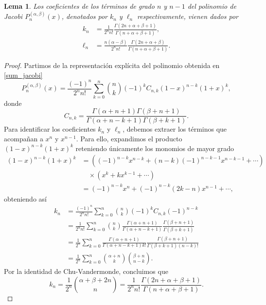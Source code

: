 \documentclass[12pt,a4paper]{book}
\newtheorem{lemma}[theorem]{Lema}
\begin{document}
\begin{lemma}
\label{lema:coeficiente_principal}
Los coeficientes de los términos de grado $n$ y $n-1$ del polinomio de Jacobi $P_n^{(\alpha, \beta)}(x)$, denotados por $k_n$ y $\ell_n$ respectivamente, vienen dados por
\begin{align*}
    k_n &= \frac{1}{2^n n!} \frac{\Gamma(2n+\alpha+\beta+1)}{\Gamma(n+\alpha+\beta+1)}, \\
    \ell_n &= \frac{n(\alpha-\beta)}{2^n n!} \frac{\Gamma(2n+\alpha+\beta)}{\Gamma(n+\alpha+\beta+1)}.
\end{align*}
\end{lemma}
\begin{proof}
Partimos de la representación explícita del polinomio obtenida en \eqref{sum_jacobi}
\begin{equation*}
    P_n^{(\alpha, \beta)}(x) = \frac{(-1)^n}{2^n n!} \sum_{k=0}^n \binom{n}{k} (-1)^k C_{n,k} (1-x)^{n-k} (1+x)^k,
\end{equation*}
donde 
\[
C_{n,k} = \frac{\Gamma(\alpha+n+1)\Gamma(\beta+n+1)}{\Gamma(\alpha+n-k+1)\Gamma(\beta+k+1)}.
\]
Para identificar los coeficientes $k_n$ y $\ell_n$, debemos extraer los términos que acompañan a $x^n$ y $x^{n-1}$. Para ello, expandimos el producto $(1-x)^{n-k}(1+x)^k$ reteniendo únicamente los monomios de mayor grado
\begin{align*}
    (1-x)^{n-k} (1+x)^k &=  \left( (-1)^{n-k} x^{n-k} + (n-k)(-1)^{n-k-1} x^{n-k-1} + \cdots \right) \\
    &\quad \times \left( x^k + k x^{k-1} + \cdots \right) \\
    &= (-1)^{n-k} x^n + (-1)^{n-k}(2k-n) x^{n-1} + \cdots,
\end{align*}
obteniendo así
\begin{align*}
    k_n &= \frac{(-1)^n}{2^n n!} \sum_{k=0}^n \binom{n}{k} (-1)^k C_{n,k} (-1)^{n-k} \\
    &= \frac{1}{2^n n!} \sum_{k=0}^n \binom{n}{k} \frac{\Gamma(\alpha+n+1)}{\Gamma(\alpha+n-k+1)} \frac{\Gamma(\beta+n+1)}{\Gamma(\beta+k+1)}\\
    &= \frac{1}{2^n} \sum_{k=0}^n \frac{\Gamma(\alpha+n+1)}{\Gamma(\alpha+n-k+1) k!} \frac{\Gamma(\beta+n+1)}{\Gamma(\beta+k+1)(n-k)!}\\
    &= \frac{1}{2^n} \sum_{k=0}^n \binom{\alpha + n}{k} \binom{\beta + n}{n-k}.
\end{align*}
Por la identidad de Chu-Vandermonde, concluimos que 
\[
    k_n = \frac{1}{2^n} \binom{\alpha+\beta+2n}{n} = \frac{1}{2^n n!} \frac{\Gamma(2n+\alpha+\beta+1)}{\Gamma(n+\alpha+\beta+1)}.
\]
\end{proof}
\end{document}
